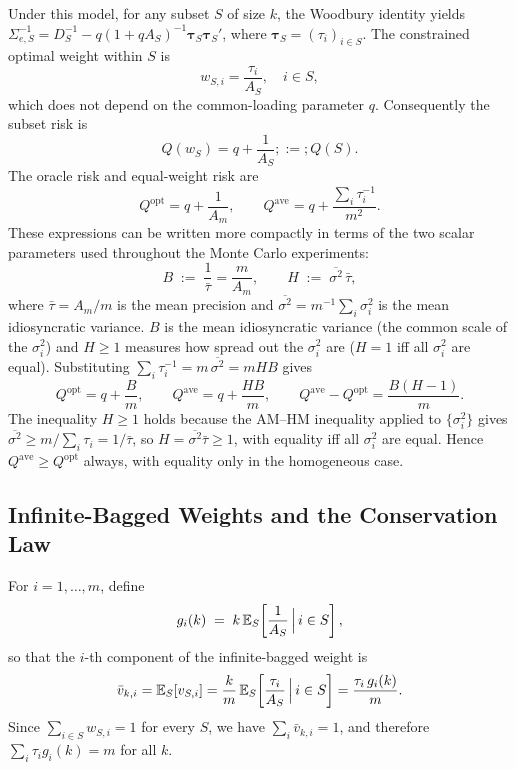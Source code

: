 \documentclass[12pt,a4paper]{article}
\theoremstyle{definition}
\newcommand{\Qopt}{Q^{\mathrm{opt}}}
\newcommand{\Qave}{Q^{\mathrm{ave}}}
\newcommand{\E}{\mathbb{E}}
\begin{document}
Under this model, for any subset $S$ of size $k$, the Woodbury identity yields
$\Sigma_{e,S}^{-1}=D_S^{-1}-q(1+qA_S)^{-1}\bm{\tau}_S\bm{\tau}_S'$, where
$\bm{\tau}_S=(\tau_i)_{i\in S}$.  The constrained optimal weight within $S$ is
\begin{equation}\label{eq:wS}
  w_{S,i} = \frac{\tau_i}{A_S},\quad i\in S,
\end{equation}
which does not depend on the common-loading parameter $q$.  Consequently
the subset risk is
\begin{equation}\label{eq:QS}
  Q(w_S) = q + \frac{1}{A_S};:=; Q(S).
\end{equation}
The oracle risk and equal-weight risk are
\begin{equation}\label{eq:Qopt_Qave}
  \Qopt = q + \frac{1}{A_m},\qquad
  \Qave = q + \frac{\sum_i\tau_i^{-1}}{m^2}.
\end{equation}
These expressions can be written more compactly in terms of the two
scalar parameters used throughout the Monte Carlo experiments:
\begin{equation}\label{eq:BH}
  B \;:=\; \frac{1}{\bar\tau} = \frac{m}{A_m},\qquad
  H \;:=\; \overline{\sigma^2}\,\bar\tau,
\end{equation}
where $\bar\tau = A_m/m$ is the mean precision and
$\overline{\sigma^2} = m^{-1}\sum_i\sigma_i^2$ is the mean idiosyncratic
variance.  $B$ is the mean idiosyncratic variance (the common scale of
the $\sigma_i^2$) and $H\ge 1$ measures how spread out the
$\sigma_i^2$ are ($H=1$ iff all $\sigma_i^2$ are equal).
Substituting $\sum_i\tau_i^{-1}=m\,\overline{\sigma^2}=mHB$ gives
\begin{equation}\label{eq:Qave_BH}
  \Qopt = q + \frac{B}{m},\qquad
  \Qave = q + \frac{HB}{m},\qquad
  \Qave - \Qopt = \frac{B(H-1)}{m}.
\end{equation}
The inequality $H\ge 1$ holds because the AM--HM inequality applied to
$\{\sigma_i^2\}$ gives $\overline{\sigma^2} \ge m/\sum_i\tau_i =
1/\bar\tau$, so $H = \overline{\sigma^2}\bar\tau \ge 1$, with equality
iff all $\sigma_i^2$ are equal.  Hence $\Qave\ge\Qopt$ always, with
equality only in the homogeneous case.

\subsection{Infinite-Bagged Weights and the Conservation Law}

For $i=1,\ldots,m$, define
\begin{equation}\label{eq:gik}
  g_i(k) \;=\; k\,\E_S\!\left[\frac{1}{A_S}\,\Bigl|\,i\in S\right],
\end{equation}
so that the $i$-th component of the infinite-bagged weight is
\begin{equation}\label{eq:vbar}
  \bar v_{k,i} = \E_S[v_{S,i}] = \frac{k}{m}\,\E_S\!\left[\frac{\tau_i}{A_S}\,\Bigl|\,i\in S\right]
  = \frac{\tau_i\,g_i(k)}{m}.
\end{equation}
Since $\sum_{i\in S}w_{S,i}=1$ for every $S$, we have $\sum_i\bar v_{k,i}=1$,
and therefore $\sum_i\tau_i g_i(k)=m$ for all $k$.
\end{document}
